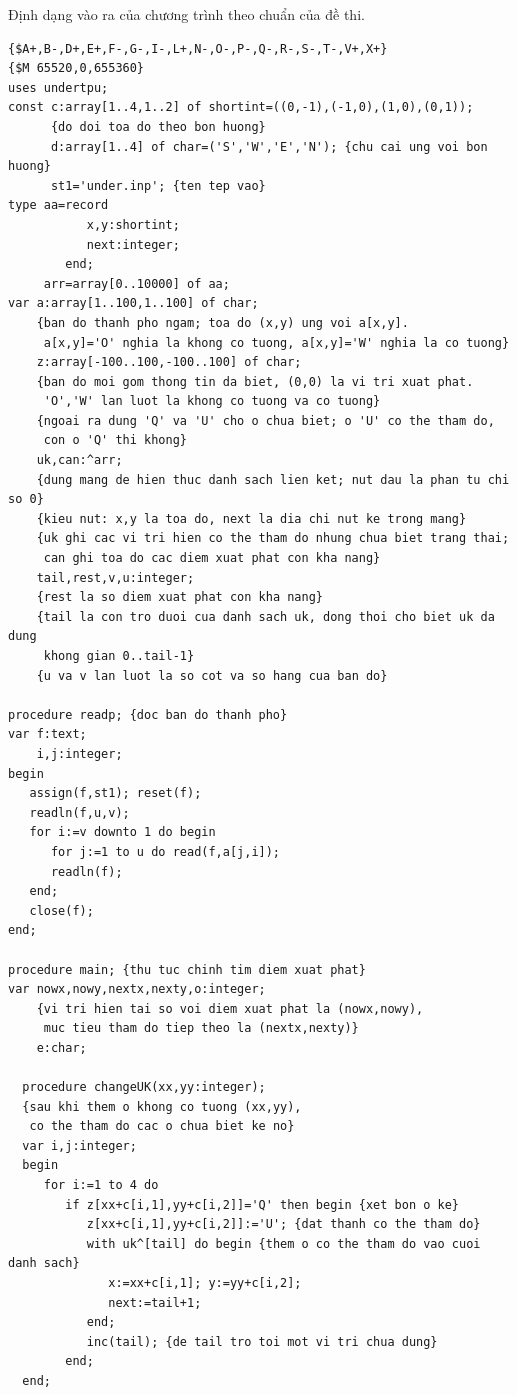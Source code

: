 \documentclass[11pt]{article}
\begin{document}
Định dạng vào ra của chương trình theo chuẩn của đề thi.

\begin{verbatim}
{$A+,B-,D+,E+,F-,G-,I-,L+,N-,O-,P-,Q-,R-,S-,T-,V+,X+}
{$M 65520,0,655360}
uses undertpu;
const c:array[1..4,1..2] of shortint=((0,-1),(-1,0),(1,0),(0,1));
      {do doi toa do theo bon huong}
      d:array[1..4] of char=('S','W','E','N'); {chu cai ung voi bon huong}
      st1='under.inp'; {ten tep vao}
type aa=record
           x,y:shortint;
           next:integer;
        end;
     arr=array[0..10000] of aa;
var a:array[1..100,1..100] of char;
    {ban do thanh pho ngam; toa do (x,y) ung voi a[x,y].
     a[x,y]='O' nghia la khong co tuong, a[x,y]='W' nghia la co tuong}
    z:array[-100..100,-100..100] of char;
    {ban do moi gom thong tin da biet, (0,0) la vi tri xuat phat.
     'O','W' lan luot la khong co tuong va co tuong}
    {ngoai ra dung 'Q' va 'U' cho o chua biet; o 'U' co the tham do,
     con o 'Q' thi khong}
    uk,can:^arr;
    {dung mang de hien thuc danh sach lien ket; nut dau la phan tu chi so 0}
    {kieu nut: x,y la toa do, next la dia chi nut ke trong mang}
    {uk ghi cac vi tri hien co the tham do nhung chua biet trang thai;
     can ghi toa do cac diem xuat phat con kha nang}
    tail,rest,v,u:integer;
    {rest la so diem xuat phat con kha nang}
    {tail la con tro duoi cua danh sach uk, dong thoi cho biet uk da dung
     khong gian 0..tail-1}
    {u va v lan luot la so cot va so hang cua ban do}

procedure readp; {doc ban do thanh pho}
var f:text;
    i,j:integer;
begin
   assign(f,st1); reset(f);
   readln(f,u,v);
   for i:=v downto 1 do begin
      for j:=1 to u do read(f,a[j,i]);
      readln(f);
   end;
   close(f);
end;

procedure main; {thu tuc chinh tim diem xuat phat}
var nowx,nowy,nextx,nexty,o:integer;
    {vi tri hien tai so voi diem xuat phat la (nowx,nowy),
     muc tieu tham do tiep theo la (nextx,nexty)}
    e:char;

  procedure changeUK(xx,yy:integer);
  {sau khi them o khong co tuong (xx,yy),
   co the tham do cac o chua biet ke no}
  var i,j:integer;
  begin
     for i:=1 to 4 do
        if z[xx+c[i,1],yy+c[i,2]]='Q' then begin {xet bon o ke}
           z[xx+c[i,1],yy+c[i,2]]:='U'; {dat thanh co the tham do}
           with uk^[tail] do begin {them o co the tham do vao cuoi danh sach}
              x:=xx+c[i,1]; y:=yy+c[i,2];
              next:=tail+1;
           end;
           inc(tail); {de tail tro toi mot vi tri chua dung}
        end;
  end;


\end{verbatim}
\end{document}
